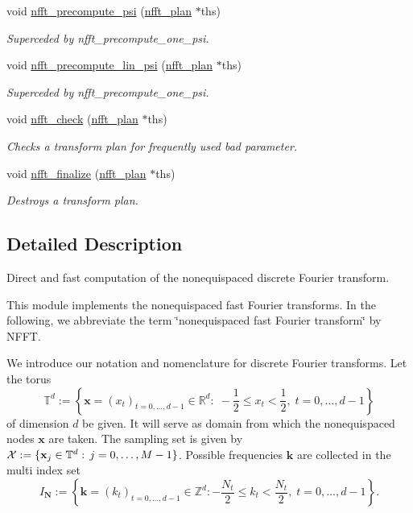\begin{CompactItemize}
void \hyperlink{group__nfft_ga12}{nfft\_\-precompute\_\-psi} (\hyperlink{structnfft__plan}{nfft\_\-plan} $\ast$ths)
\begin{CompactList}\small\item\em Superceded by nfft\_\-precompute\_\-one\_\-psi. \item\end{CompactList}\item 
void \hyperlink{group__nfft_ga13}{nfft\_\-precompute\_\-lin\_\-psi} (\hyperlink{structnfft__plan}{nfft\_\-plan} $\ast$ths)
\begin{CompactList}\small\item\em Superceded by nfft\_\-precompute\_\-one\_\-psi. \item\end{CompactList}\item 
void \hyperlink{group__nfft_ga14}{nfft\_\-check} (\hyperlink{structnfft__plan}{nfft\_\-plan} $\ast$ths)
\begin{CompactList}\small\item\em Checks a transform plan for frequently used bad parameter. \item\end{CompactList}\item 
void \hyperlink{group__nfft_ga15}{nfft\_\-finalize} (\hyperlink{structnfft__plan}{nfft\_\-plan} $\ast$ths)
\begin{CompactList}\small\item\em Destroys a transform plan. \item\end{CompactList}\end{CompactItemize}


\subsection{Detailed Description}
Direct and fast computation of the nonequispaced discrete Fourier transform. 

This module implements the nonequispaced fast Fourier transforms. In the following, we abbreviate the term \char`\"{}nonequispaced fast Fourier transform\char`\"{} by NFFT.

We introduce our notation and nomenclature for discrete Fourier transforms. Let the torus \[ \mathbb{T}^d := \left\{ \mathbf{x}=\left(x_t\right)_{t=0,\hdots,d-1}\in\mathbb{R}^{d}: \; - \frac{1}{2} \le x_t < \frac{1}{2},\; t=0,\hdots,d-1 \right\} \] of dimension $d$ be given. It will serve as domain from which the nonequispaced nodes $\mathbf{x}$ are taken. The sampling set is given by ${\cal X}:=\{\mathbf{x}_j \in {\mathbb T}^d: \,j=0,\hdots,M-1\}$. Possible frequencies $\mathbf{k}$ are collected in the multi index set \[ I_{\mathbf{N}} := \left\{ \mathbf{k}=\left(k_t\right)_{t=0,\hdots,d-1}\in \mathbb{Z}^d: - \frac{N_t}{2} \le k_t < \frac{N_t}{2} ,\;t=0,\hdots,d-1 \right\}. \]

